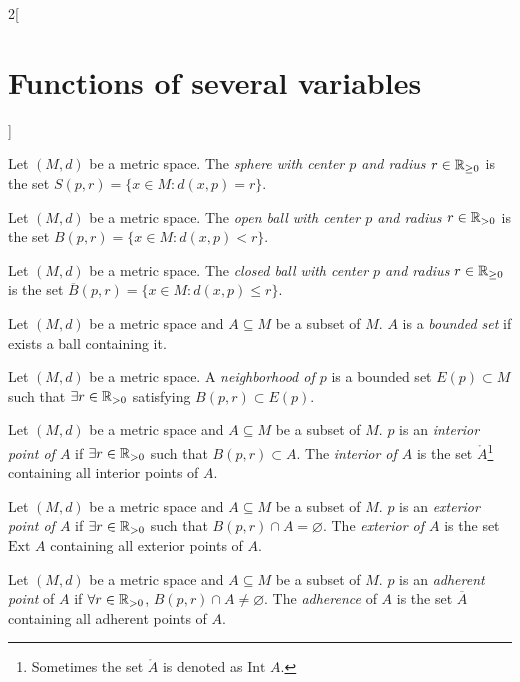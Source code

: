 \documentclass[../../../main.tex]{subfiles}
\begin{document}
\begin{multicols}{2}[\section{Functions of several variables}]
\begin{corollary}
\begin{enumerate}
    \end{enumerate}
  \end{corollary}
  \begin{definition}
    Let $(M,d)$ be a metric space. The \textit{sphere with center $p$ and radius $r\in\mathbb{R}_{\geq 0}$} is the set $S(p,r)=\{x\in M:d(x,p)=r\}$.
  \end{definition}
  \begin{definition}
    Let $(M,d)$ be a metric space. The \textit{open ball with center $p$ and radius $r\in\mathbb{R}_{>0}$} is the set $B(p,r)=\{x\in M:d(x,p)<r\}$.
  \end{definition}
  \begin{definition}
    Let $(M,d)$ be a metric space. The \textit{closed ball with center $p$ and radius $r\in\mathbb{R}_{\geq 0}$} is the set $\overline{B}(p,r)=\{x\in M:d(x,p)\leq r\}$.
  \end{definition}
  \begin{definition}
    Let $(M,d)$ be a metric space and $A\subseteq M$ be a subset of $M$. $A$ is a \textit{bounded set} if exists a ball containing it.
  \end{definition}
  \begin{definition}
    Let $(M,d)$ be a metric space. A \textit{neighborhood of $p$} is a bounded set $E(p)\subset M$ such that $\exists r\in\mathbb{R}_{>0}$ satisfying $B(p,r)\subset E(p)$.
  \end{definition}
  \begin{definition}
    Let $(M,d)$ be a metric space and $A\subseteq M$ be a subset of $M$. $p$ is an \textit{interior point of $A$} if $\exists r\in\mathbb{R}_{>0}$ such that $B(p,r)\subset A$. The \textit{interior of $A$} is the set $\mathring A$\footnote{Sometimes the set $\mathring A$ is denoted as $\text{Int }A$.} containing all interior points of $A$.
  \end{definition}
  \begin{definition}
    Let $(M,d)$ be a metric space and $A\subseteq M$ be a subset of $M$. $p$ is an \textit{exterior point of $A$} if $\exists r\in\mathbb{R}_{>0}$ such that $B(p,r)\cap A=\varnothing$. The \textit{exterior of $A$} is the set $\text{Ext } A$ containing all exterior points of $A$.
  \end{definition}
  \begin{definition}
    Let $(M,d)$ be a metric space and $A\subseteq M$ be a subset of $M$. $p$ is an \textit{adherent point} of $A$ if $\forall r\in\mathbb{R}_{>0}$, $B(p,r)\cap A\ne\varnothing$. The \textit{adherence} of $A$ is the set $\overline{A}$ containing all adherent points of $A$.

\end{definition}
\end{multicols}
\end{document}
